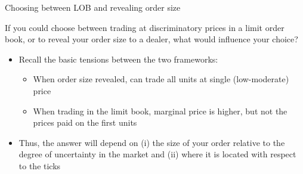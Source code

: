 \documentclass[english,10pt,aspectratio=169]{beamer}
\begin{document}
\begin{frame}{Choosing between LOB and revealing order size}
	\begin{exampleblock}{}
		If you could choose between trading at discriminatory prices in a limit order book, or to reveal your order size to a dealer, what would influence your choice?
	\end{exampleblock}
	\begin{itemize}
		\item Recall the basic tensions between the two frameworks: 
		\begin{itemize}
			\item When order size revealed, can trade all units at single (low-moderate) price
			\item When trading in the limit book, marginal price is higher, but not the prices paid on the first units
		\end{itemize}
		\item Thus, the answer will depend on (i) the size of your order relative to the degree of uncertainty in the market and (ii) where it is located with respect to the ticks
	\end{itemize}
\end{frame}
\end{document}
